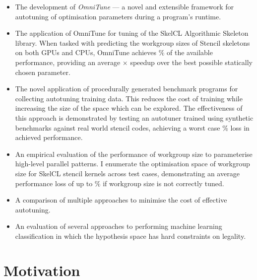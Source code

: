 \begin{itemize}
\item The development of \emph{OmniTune} --- a novel and extensible
  framework for autotuning of optimisation parameters during a
  program's runtime.
\item The application of OmniTune for tuning of the SkelCL Algorithmic
  Skeleton library. When tasked with predicting the workgroup sizes of
  Stencil skeletons on both GPUs and CPUs, OmniTune achieves
  $\%$ of the available
  performance, providing an average
  $\times$ speedup over the
  best possible statically chosen parameter.
\item The novel application of procedurally generated benchmark
  programs for collecting autotuning training data. This reduces the
  cost of training while increasing the size of the space which can be
  explored. The effectiveness of this approach is demonstrated by
  testing an autotuner trained using synthetic benchmarks against
   real world stencil codes, achieving a
  worst case
  $\%$
  loss in achieved performance.
\item An empirical evaluation of the performance of workgroup size to
  parameterise high-level parallel patterns. I enumerate the
  optimisation space of workgroup size for SkelCL stencil kernels
  across  test cases, demonstrating an
  average performance loss of up to
  $\%$ if workgroup size is not
  correctly tuned. %
\item A comparison of multiple approaches to minimise the cost of
  effective autotuning. 
\item An evaluation of several approaches to performing machine
  learning classification in which the hypothesis space has hard
  constraints on legality. 
\end{itemize}


\section{Motivation}

